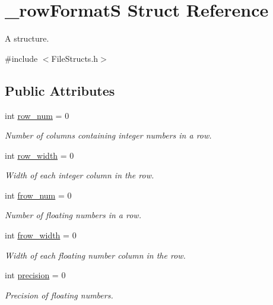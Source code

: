 \hypertarget{struct__row_format_s}{}\section{\+\_\+row\+FormatS Struct Reference}
\label{struct__row_format_s}


A structure.  




{\ttfamily \#include $<$File\+Structs.\+h$>$}

\subsection*{Public Attributes}
\begin{DoxyCompactItemize}
\item 
int \hyperlink{struct__row_format_s_ac7451588121fa109b772db97b509e734}{row\+\_\+num} = 0
\begin{DoxyCompactList}\small\item\em Number of columns containing integer numbers in a row. \end{DoxyCompactList}\item 
int \hyperlink{struct__row_format_s_a4f667918f753a059f84301db23d70e68}{row\+\_\+width} = 0
\begin{DoxyCompactList}\small\item\em Width of each integer column in the row. \end{DoxyCompactList}\item 
int \hyperlink{struct__row_format_s_a5a9d061cbfd29e54026f22a6577b1c51}{frow\+\_\+num} = 0
\begin{DoxyCompactList}\small\item\em Number of floating numbers in a row. \end{DoxyCompactList}\item 
int \hyperlink{struct__row_format_s_ad8290b8370984dfd0fe1d47329415e57}{frow\+\_\+width} = 0
\begin{DoxyCompactList}\small\item\em Width of each floating number column in the row. \end{DoxyCompactList}\item 
int \hyperlink{struct__row_format_s_afd1ddfa4acdc5ea24e031d38ec6dbc77}{precision} = 0
\begin{DoxyCompactList}\small\item\em Precision of floating numbers. \end{DoxyCompactList}\end{DoxyCompactItemize}


